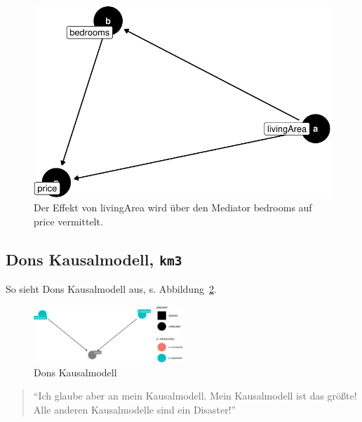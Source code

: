 \documentclass[
  a4paper,
  DIV=11]{scrreprt}
\theoremstyle{definition}
\theoremstyle{remark}
\begin{document}
\begin{figure}

{\centering \includegraphics{./kausal_files/figure-pdf/fig-m1-mediation-1.pdf}

}

\caption{\label{fig-m1-mediation}Der Effekt von livingArea wird über den
Mediator bedrooms auf price vermittelt.}

\end{figure}

\hypertarget{dons-kausalmodell-km3}{%
\subsection{\texorpdfstring{Dons Kausalmodell,
\texttt{km3}}{Dons Kausalmodell, km3}}\label{dons-kausalmodell-km3}}

So sieht Dons Kausalmodell aus, s. Abbildung~\ref{fig-km3}.

\begin{figure}

{\centering \includegraphics[width=0.5\textwidth,height=\textheight]{./kausal_files/figure-pdf/fig-km3-1.pdf}

}

\caption{\label{fig-km3}Dons Kausalmodell}

\end{figure}

\begin{quote}
``Ich glaube aber an mein Kausalmodell. Mein Kausalmodell ist das
größte! Alle anderen Kausalmodelle sind ein Disaster!''
\end{quote}
\end{document}
